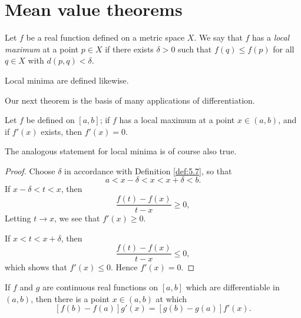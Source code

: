 \section{Mean value theorems}
\begin{mydef}
    \label{def:5.7}
    Let $f$ be a real function defined on a metric space $X$.
    We say that $f$ has a \emph{local maximum} at a point $p \in X$ 
    if there exists $\delta > 0$ 
    such that $f(q) \leq f(p)$ 
    for all $q \in X$ with $d(p, q) < \delta$.
\end{mydef}
Local minima are defined likewise.

Our next theorem is the basis of many applications of differentiation.
\begin{thm}
    \label{thm:5.8}
    Let $f$ be defined on $[a, b]$;
    if $f$ has a local maximum at a point $x \in (a, b)$, 
    and if $f'(x)$ exists, then $f'(x) = 0$.
\end{thm}

The analogous statement for local minima is of course also true.
\begin{proof}
    Choose $\delta$ in accordance with Definition \ref{def:5.7}, 
    so that
    \begin{equation*}
        a < x - \delta < x < x + \delta < b.
    \end{equation*}
    If $x - \delta < t < x$, then
    \begin{equation*}
        \frac{f(t)-f(x)}{t-x} \geq 0,
    \end{equation*}
    Letting $t \rightarrow x$, we see that $f'(x) \geq 0$.
    
    If $x < t < x + \delta$, then 
    \begin{equation*}
        \frac{f(t) -f(x)}{t-x} \leq 0,
    \end{equation*}
    which shows that $f'(x) \leq 0$. Hence $f'(x) = 0$.
\end{proof}

\begin{thm}
    \label{thm:5.9}
    If $f$ and $g$ are continuous real functions on $[a, b]$ 
    which are differentiable in $(a, b)$, 
    then there is a point $x \in (a, b)$ at which
    \begin{equation*}
        \left[ f(b) - f(a) \right]g'(x) = 
        \left[ g(b) - g(a) \right]f'(x).
    \end{equation*}
\end{thm}


